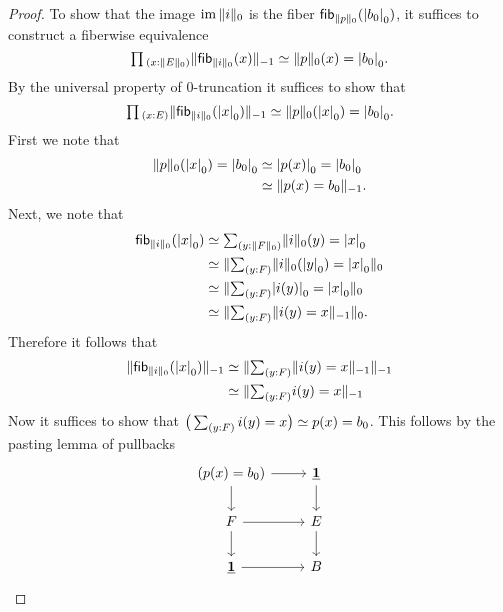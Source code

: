 \begin{proof}
To show that the image $\im\trunc{0}{i}$ is the fiber $\fib{\trunc{0}{p}}{\tproj{0}{b_0}}$, it suffices to construct a fiberwise equivalence
\begin{equation*}
\prd{x:\trunc{0}{E}} \trunc{-1}{\fib{\trunc{0}{i}}{x}} \eqvsym \trunc{0}{p}(x)=\tproj{0}{b_0}.
\end{equation*}
By the universal property of $0$-truncation it suffices to show that
\begin{equation*}
\prd{x:E} \trunc{-1}{\fib{\trunc{0}{i}}{\tproj{0}{x}}} \eqvsym \trunc{0}{p}(\tproj{0}{x})=\tproj{0}{b_0}.
\end{equation*}
First we note that 
\begin{align*}
\trunc{0}{p}(\tproj{0}{x})=\tproj{0}{b_0} & \eqvsym \tproj{0}{p(x)} = \tproj{0}{b_0} \\
& \eqvsym \trunc{-1}{p(x)=b_0}.
\end{align*}
Next, we note that
\begin{align*}
\fib{\trunc{0}{i}}{\tproj{0}{x}} & \eqvsym \sm{y:\trunc{0}{F}}\trunc{0}{i}(y)=\tproj{0}{x} \\
& \eqvsym \trunc{0}{\sm{y:F}\trunc{0}{i}(\tproj{0}{y})=\tproj{0}{x}} \\
& \eqvsym \trunc{0}{\sm{y:F}\tproj{0}{i(y)}=\tproj{0}{x}} \\
& \eqvsym \trunc{0}{\sm{y:F}\trunc{-1}{i(y)=x}}.
\end{align*}
Therefore it follows that
\begin{align*}
\trunc{-1}{\fib{\trunc{0}{i}}{\tproj{0}{x}}} & \eqvsym \trunc{-1}{\sm{y:F}\trunc{-1}{i(y)=x}} \\
& \eqvsym \trunc{-1}{\sm{y:F}i(y)=x} \\
\end{align*}
Now it suffices to show that $\eqv{\big(\sm{y:F}i(y)=x\big)}{p(x)=b_0}$. This follows by the pasting lemma of pullbacks
\begin{equation*}
\begin{tikzcd}
(p(x)=b_0) \arrow[r] \arrow[d] & \unit \arrow[d] \\
F \arrow[r] \arrow[d] & E \arrow[d] \\
\unit \arrow[r] & B
\end{tikzcd}
\end{equation*}
\end{proof}

